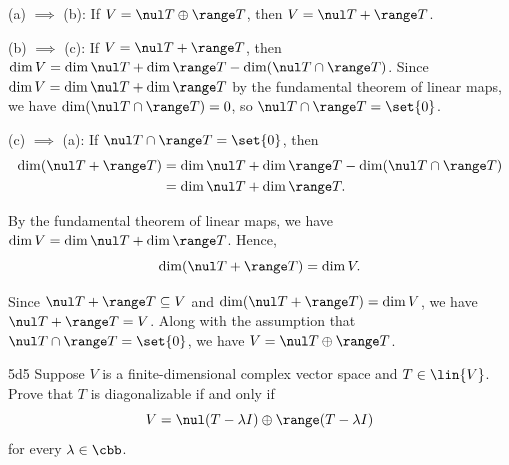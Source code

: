 \begin{sol}
    \leavevmode

    \noindent(a) $\implies$ (b): If $V = \nul T \oplus \range T$, then $V = \nul T + \range T$.
    
    \noindent(b) $\implies$ (c): If $V = \nul T + \range T$, then $\dim V = \dim \nul T + \dim \range T - \dim(\nul T \cap \range T)$.
    Since $\dim V = \dim \nul T + \dim \range T$ by the fundamental theorem of linear maps, we have $\dim(\nul T \cap \range T) = 0$, so $\nul T \cap \range T = \set{0}$.

    \noindent(c) $\implies$ (a): If $\nul T \cap \range T = \set{0}$, then
    \begin{align*}
        \dim(\nul T + \range T) &= \dim \nul T + \dim \range T - \dim(\nul T \cap \range T) \\
        &= \dim \nul T + \dim \range T. \\
    \end{align*}
    
    By the fundamental theorem of linear maps, we have $\dim V = \dim \nul T + \dim \range T$.
    Hence,
    \[
        \dim(\nul T + \range T) = \dim V.
    \]

    Since $\nul T + \range T \subseteq V$ and $\dim(\nul T + \range T) = \dim V$, we have $\nul T + \range T = V$.
    Along with the assumption that $\nul T \cap \range T = \set{0}$, we have $V = \nul T \oplus \range T$.
\end{sol}

\begin{exercise}{5d5}
    Suppose $V$ is a finite-dimensional complex vector space and $T \in \lin{V}$.
    Prove that $T$ is diagonalizable if and only if
    \[
        V = \nul(T - \lambda I) \oplus \range(T - \lambda I)
    \]
    for every $\lambda \in \cbb$.
\end{exercise}


